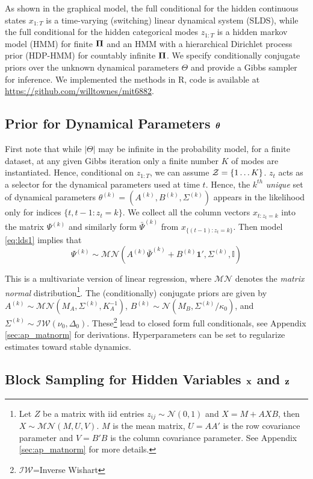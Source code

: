 \documentclass{article} %
\begin{document}
As shown in the graphical model, the full conditional for the hidden continuous states $x_{1:T}$ is a time-varying (switching) linear dynamical system (SLDS), while the full conditional for the hidden categorical modes $z_{1:T}$ is a hidden markov model (HMM) for finite $\boldsymbol{\Pi}$ and an HMM with a hierarchical Dirichlet process prior (HDP-HMM) for countably infinite $\boldsymbol{\Pi}$. We specify conditionally conjugate priors over the unknown dynamical parameters $\Theta$ and provide a Gibbs sampler for inference. We implemented the methods in R, code is available at \url{https://github.com/willtownes/mit6882}.

\subsection{Prior for Dynamical Parameters $\boldsymbol{\theta}$}

First note that while $\vert\Theta\vert$ may be infinite in the probability model, for a finite dataset, at any given Gibbs iteration only a finite number $K$ of modes are instantiated. Hence, conditional on $z_{1:T}$, we can assume ${\cal Z}=\{1\ldots K\}$. $z_t$ acts as a selector for the dynamical parameters used at time $t$. Hence, the $k^{th}$ \textit{unique} set of dynamical parameters $\theta^{(k)} = (A^{(k)},B^{(k)},\Sigma^{(k)})$ appears in the likelihood only for indices $\{t,t-1: z_t=k\}$. We collect all the column vectors $x_{t:z_t=k}$ into the matrix $\Psi^{(k)}$ and similarly form $\bar{\Psi}^{(k)}$ from $x_{\{(t-1):z_t=k\}}$. Then model \eqref{eq:lds1} implies that
\[\Psi^{(k)}\sim\mathcal{MN}(A^{(k)}\bar{\Psi}^{(k)}+B^{(k)}\mathbf{1}',\Sigma^{(k)},\mathbb{I})\]

This is a multivariate version of linear regression, where $\mathcal{MN}$ denotes the \textit{matrix normal} distribution\footnote{Let $Z$ be a matrix with iid entries $z_{ij}\sim\mathcal{N}(0,1)$ and $X=M+AXB$, then $X\sim\mathcal{MN}(M,U,V)$. $M$ is the mean matrix, $U=AA'$ is the row covariance parameter and $V=B'B$ is the column covariance parameter. See Appendix \ref{sec:ap_matnorm} for more details.}. The (conditionally) conjugate priors are given by $A^{(k)}\sim\mathcal{MN}(M_A,\Sigma^{(k)},K_A^{-1})$, $B^{(k)}\sim\mathcal{N}(M_B,\Sigma^{(k)}/\kappa_0)$, and $\Sigma^{(k)}\sim\mathcal{IW}(\nu_0,\Delta_0)$. These\footnote{$\mathcal{IW}$=Inverse Wishart} lead to closed form full conditionals, see Appendix \ref{sec:ap_matnorm} for derivations. Hyperparameters can be set to regularize estimates toward stable dynamics.

\subsection{Block Sampling for Hidden Variables ${\bf x}$ and ${\bf z}$}
\end{document}
